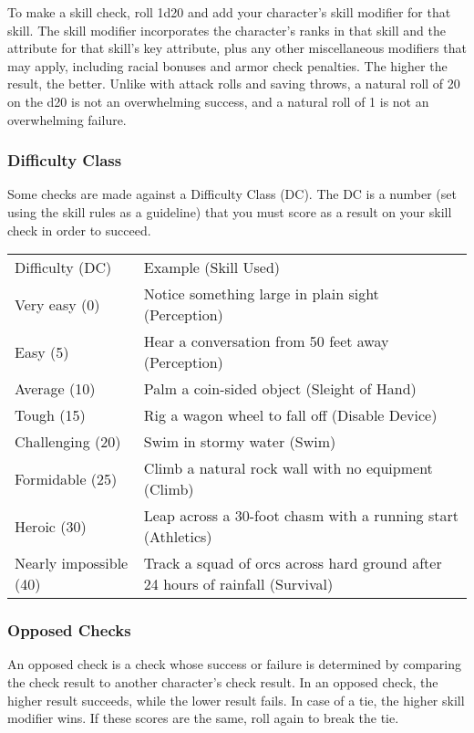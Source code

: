 To make a skill check, roll 1d20 and add your character's skill modifier for that skill. The skill modifier incorporates the character's ranks in that skill and the attribute for that skill's key attribute, plus any other miscellaneous modifiers that may apply, including racial bonuses and armor check penalties. The higher the result, the better. Unlike with attack rolls and saving throws, a natural roll of 20 on the d20 is not an overwhelming success, and a natural roll of 1 is not an overwhelming failure.

\subsubsection{Difficulty Class}
Some checks are made against a Difficulty Class (DC). The DC is a number (set using the skill rules as a guideline) that you must score as a result on your skill check in order to succeed.

\begin{dtable}
\begin{tabularx}{\columnwidth}{p{8em} X}
Difficulty (DC) & Example (Skill Used) \\
Very easy (0) & Notice something large in plain sight (Perception) \\
Easy (5) & Hear a conversation from 50 feet away (Perception) \\
Average (10) & Palm a coin-sided object (Sleight of Hand) \\
Tough (15) & Rig a wagon wheel to fall off (Disable Device) \\
Challenging (20) & Swim in stormy water (Swim) \\
Formidable (25) & Climb a natural rock wall with no equipment (Climb) \\
Heroic (30) & Leap across a 30-foot chasm with a running start (Athletics) \\
Nearly impossible (40) & Track a squad of orcs across hard ground after 24 hours of rainfall (Survival) \\
\end{tabularx}
\end{dtable}

\subsubsection{Opposed Checks}
An opposed check is a check whose success or failure is determined by comparing the check result to another character's check result. In an opposed check, the higher result succeeds, while the lower result fails. In case of a tie, the higher skill modifier wins. If these scores are the same, roll again to break the tie.

